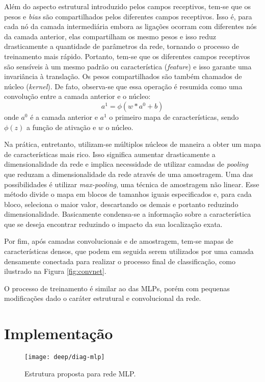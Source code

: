 Além do aspecto estrutural introduzido pelos campos receptivos, tem-se que os pesos e \textit{bias} são compartilhados pelos diferentes campos receptivos. Isso é, para cada nó da camada intermediária embora as ligações ocorram com diferentes nós da camada anterior, elas compartilham os mesmo pesos e isso reduz drasticamente a quantidade de parâmetros da rede, tornando o processo de treinamento mais rápido. Portanto, tem-se que os diferentes campos receptivos são sensíveis à um mesmo padrão ou característica (\textit{feature}) e isso garante uma invariância à translação. Os pesos compartilhados são também chamados de núcleo (\textit{kernel}). De fato, observa-se que essa operação é resumida como uma convolução entre a camada anterior e o núcleo:
\begin{equation}
a^1 = \phi(w \ast a^0 + b) 
\end{equation}
onde $a^0$ é a camada anterior e $a^1$ o primeiro mapa de características, sendo $\phi(z)$ a função de ativação e $w$ o núcleo.

Na prática, entretanto, utilizam-se múltiplos núcleos de maneira a obter um mapa de características mais rico. Isso significa aumentar drasticamente a dimensionalidade da rede e implica necessidade de utilizar camadas de \textit{pooling} que reduzam a dimensionalidade da rede através de uma amostragem. Uma das possibilidades é utilizar \textit{max-pooling}, uma técnica de amostragem não linear. Esse método divide o mapa em blocos de tamanhos iguais especificados e, para cada bloco, seleciona o maior valor, descartando os demais e portanto reduzindo dimensionalidade. Basicamente condensa-se a informação sobre a característica que se deseja encontrar reduzindo o impacto da sua localização exata.

Por fim, após camadas convolucionais e de amostragem, tem-se mapas de características densos, que podem em seguida serem utilizados por uma camada densamente conectada para realizar o processo final de classificação, como ilustrado na Figura \ref{fig:convnet}. 

O processo de treinamento é similar ao das MLPs, porém com pequenas modificações dado o caráter estrutural e convolucional da rede.

\section{Implementação}
\begin{figure}
\centering
\texttt{[image: deep/diag-mlp]}
\caption{Estrutura proposta para rede MLP.}
\label{fig:diag-mlp}
\end{figure}

